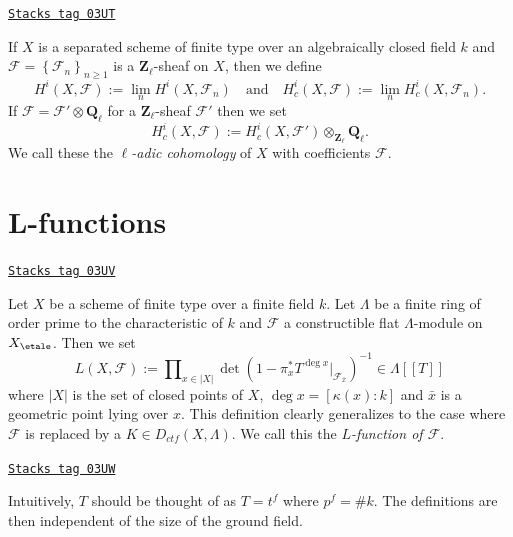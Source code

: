 \begin{definition}
\label{trace-definition-cohomology-l-adic}
\href{https://stacks.math.columbia.edu/tag/03UT}{\texttt{Stacks tag 03UT}}

If $X$ is a separated scheme of finite type over an algebraically closed field
$k$ and $\mathcal{F} = \left\{\mathcal{F}_n\right\}_{n\geq 1}$ is a
$\mathbf{Z}_\ell$-sheaf on $X$, then we define
$$
H^i(X, \mathcal{F}) := \lim_n H^i(X, \mathcal{F}_n)
\quad\text{and}\quad
H_c^i(X, \mathcal{F}) := \lim_n H_c^i(X, \mathcal{F}_n).
$$
If $\mathcal{F} = \mathcal{F}'\otimes \mathbf{Q}_\ell$ for a
$\mathbf{Z}_\ell$-sheaf $\mathcal{F}'$ then we set
$$
H_c^i(X , \mathcal{F}) := H_c^i(X,
\mathcal{F}')\otimes_{\mathbf{Z}_\ell}\mathbf{Q}_\ell.
$$
We call these the {\it $\ell$-adic cohomology} of $X$ with coefficients
$\mathcal{F}$.
\end{definition}

\section{L-functions}
\label{trace-section-L-function}
\begin{definition}
\label{trace-definition-L-function-finite-ring}
\href{https://stacks.math.columbia.edu/tag/03UV}{\texttt{Stacks tag 03UV}}

Let $X$ be a scheme of finite type over a finite field $k$. Let $\Lambda$ be a
finite ring of order prime to the characteristic of $k$ and $\mathcal{F}$ a
constructible flat $\Lambda$-module on $X_\etale$. Then we set
$$
L(X, \mathcal{F}) :=
\prod\nolimits_{x\in |X|}
\det(1 - \pi_x^*T^{\deg x} |_{\mathcal{F}_{\bar x}})^{-1} \in \Lambda [[ T ]]
$$
where $|X|$ is the set of closed points of $X$, $\deg x = [\kappa(x): k]$ and
$\bar x$ is a geometric point lying over $x$. This definition clearly
generalizes to the case where $\mathcal{F}$ is replaced by a
$K \in D_{ctf}(X, \Lambda)$. We call this the {\it $L$-function of
$\mathcal{F}$}.
\end{definition}

\begin{remark}[T]
\label{trace-remark-T}
\href{https://stacks.math.columbia.edu/tag/03UW}{\texttt{Stacks tag 03UW}}

Intuitively, $T$ should be thought of as $T = t^f$ where $p^f = \# k$. The
definitions are then independent of the size of the ground field.
\end{remark}

